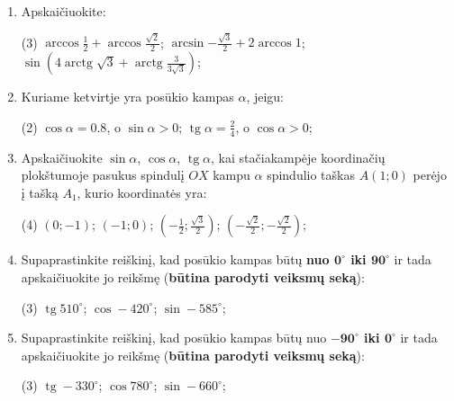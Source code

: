 \documentclass[a4paper]{article}
\DeclareMathOperator{\tg}{tg}
\DeclareMathOperator{\arctg}{arctg}
\begin{document}
\begin{enumerate}
      \item Apskaičiuokite:

            \begin{tasks}[item-format={\normalfont}, after-item-skip=4mm](3)
                  \task $\arccos{\frac{1}{2}} + \arccos{\frac{\sqrt{2}}{2}} $;
                  \task $\arcsin{-\frac{\sqrt{3}}{2}} + 2\arccos{1} $;
                  \task $\sin({4\arctg{\sqrt{3}} +
                              \arctg{\frac{3}{3\sqrt{3}}}})  $;

            \end{tasks}

      \item Kuriame ketvirtje yra posūkio kampas $\alpha$, jeigu:
            \begin{tasks}[item-format={\normalfont}, after-item-skip=4mm](2)
                  \task $\cos \alpha = 0.8$, o $\sin \alpha > 0$;
                  \task $\tg \alpha = \frac{2}{4}$, o $\cos \alpha > 0$;
            \end{tasks}
      \item Apskaičiuokite $\sin \alpha$, $\cos \alpha$, $\tg \alpha$, kai
            stačiakampėje koordinačių plokštumoje pasukus spindulį $OX$ kampu
            $\alpha$ spindulio taškas $A(1; 0)$ perėjo į tašką $A_{1}$, kurio
            koordinatės
            yra:
            \begin{tasks}[item-format={\normalfont}, after-item-skip=4mm](4)
                  \task $(0; -1)$;
                  \task $(-1; 0)$;
                  \task $(-\frac{1}{2}; \frac{\sqrt{3}}{2})$;
                  \task $(-\frac{\sqrt{2}}{2}; -\frac{\sqrt{2}}{2})$;
            \end{tasks}

      \item Supaprastinkite reiškinį, kad posūkio kampas būtų \textbf{nuo
                  $\boldsymbol{0^\circ}$
                  iki $\boldsymbol{90^\circ}$} ir tada apskaičiuokite jo
            reikšmę
            (\textbf{būtina parodyti veiksmų seką}):
            \begin{tasks}[item-format={\normalfont},
                        after-item-skip=4mm](3)
                  \task $\tg 510^\circ$;
                  \task $\cos -420^\circ$;
                  \task $\sin -585^\circ$;
            \end{tasks}

      \item Supaprastinkite reiškinį, kad posūkio kampas būtų nuo
            \textbf{$\boldsymbol{-90^\circ}$
                  iki  $\boldsymbol{0^\circ}$} ir tada apskaičiuokite jo
            reikšmę
            (\textbf{būtina parodyti veiksmų seką}):
            \begin{tasks}[item-format={\normalfont},
                        after-item-skip=4mm](3)
                  \task $\tg -330^\circ$;
                  \task $\cos 780^\circ$;
                  \task $\sin -660^\circ$;
            \end{tasks}


\end{enumerate}
\end{document}
